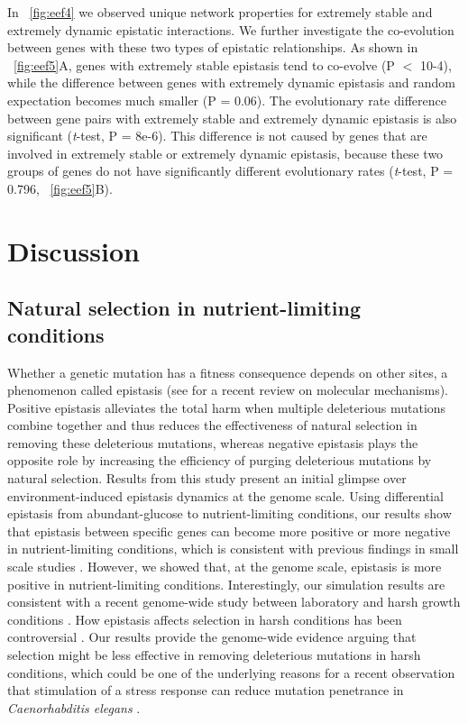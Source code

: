 In \Fig~\ref{fig:eef4} we observed unique network properties for extremely stable
and extremely dynamic epistatic interactions. We further investigate
the co-evolution between genes with these two types of epistatic
relationships. As shown in \Fig~\ref{fig:eef5}A, genes with extremely stable
epistasis tend to co-evolve (P $<$ 10-4), while the difference between
genes with extremely dynamic epistasis and random expectation becomes
much smaller (P = 0.06). The evolutionary rate difference between gene
pairs with extremely stable and extremely dynamic epistasis is also
significant (\textit{t}-test, P = 8e-6). This difference is not caused by
genes that are involved in extremely stable or extremely dynamic
epistasis, because these two groups of genes do not have significantly
different evolutionary rates (\textit{t}-test, P = 0.796, \Fig~\ref{fig:eef5}B).

\section{Discussion}

\subsection{Natural selection in nutrient-limiting conditions}

Whether a genetic mutation has a fitness consequence depends on other
sites, a phenomenon called epistasis (see \citealt{Lehner2011} for a
recent review on
molecular mechanisms). Positive epistasis alleviates the total harm
when multiple deleterious mutations combine together and thus reduces
the effectiveness of natural selection in removing these deleterious
mutations, whereas negative epistasis plays the opposite role by
increasing the efficiency of purging deleterious mutations by natural
selection. Results from this study present an initial glimpse over
environment-induced epistasis dynamics at the genome scale. Using
differential epistasis from abundant-glucose to nutrient-limiting
conditions, our results show that epistasis between specific genes can
become more positive or more negative in nutrient-limiting conditions,
which is consistent with previous findings in small scale studies
\citep{Remold2001, Kishony2003, Cooper2005, Korona1999, Szafraniec2001,
Jasnos2008, Vassilieva2000, Baer2006, Yang2001, Fry2002,
AletheaD.Wang2009, Young2009}. However, we showed that, at the genome
scale, epistasis is
more positive in nutrient-limiting conditions. Interestingly, our
simulation results are consistent with a recent genome-wide study
between laboratory and harsh growth conditions
\citep{Bandyopadhyay2011}. How epistasis affects selection in harsh
conditions has been controversial \citep{Agrawal2010}. Our
results provide the genome-wide evidence arguing that selection might
be less effective in removing deleterious mutations in harsh
conditions, which could be one of the underlying reasons for a recent
observation that stimulation of a stress response can reduce mutation
penetrance in \textit{Caenorhabditis elegans} \citep{Casanueva2012}.

